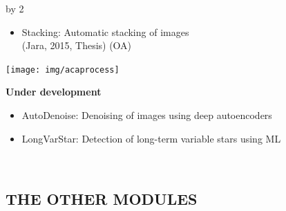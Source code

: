 \documentclass[11pt]{scrartcl}
\def\anzspalten{2}
\newlength{\kastenwidth}
\newenvironment{kasten}{
  \begin{lrbox}{\dummybox}
    \begin{minipage}{\linewidth}}
    {\end{minipage}
  \end{lrbox}
  \raisebox{-\depth}{\psshadowbox[cornersize=absolute,linearc=14pt,framesep=1em]{\usebox{\dummybox}}}\\[0.5em]}
\newenvironment{spalte}{
  \setlength\kastenwidth{1.2\textwidth}
  \divide\kastenwidth by \anzspalten
  \begin{minipage}[t]{\kastenwidth}}{\end{minipage}}
\begin{document}
\begin{lrbox}{\spalten}
{\begin{spalte}
\begin{kasten}
\begin{minipage}{0.45\linewidth}
\begin{itemize}
Thesis) (OA)
\item Stacking: Automatic stacking of images \\ (Jara, 2015, Thesis) (OA)
\end{itemize}
			\end{minipage}
\hfill
			\begin{minipage}{0.50\textwidth}
			\begin{center}
                        	\texttt{[image: img/acaprocess]}
			\end{center}
\textbf{Under development}
\begin{itemize}
\item AutoDenoise: Denoising of images using deep autoencoders
\item LongVarStar: Detection of long-term variable stars using ML
\end{itemize}
          \end{minipage}
	 \end{kasten}

	\begin{kasten}

        \section*{\hspace{0.2cm} {\color{red} THE OTHER MODULES} }


\end{kasten}
\end{spalte}}
\end{lrbox}
\end{document}
